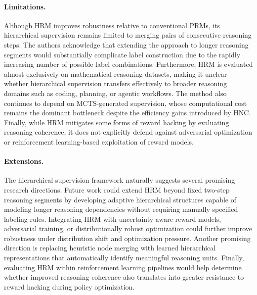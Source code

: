 \documentclass[11pt]{article}
\begin{document}
\paragraph{Limitations.}
Although HRM improves robustness relative to conventional PRMs, its hierarchical supervision remains limited to merging pairs of consecutive reasoning steps. The authors acknowledge that extending the approach to longer reasoning segments would substantially complicate label construction due to the rapidly increasing number of possible label combinations. Furthermore, HRM is evaluated almost exclusively on mathematical reasoning datasets, making it unclear whether hierarchical supervision transfers effectively to broader reasoning domains such as coding, planning, or agentic workflows. The method also continues to depend on MCTS-generated supervision, whose computational cost remains the dominant bottleneck despite the efficiency gains introduced by HNC. Finally, while HRM mitigates some forms of reward hacking by evaluating reasoning coherence, it does not explicitly defend against adversarial optimization or reinforcement learning-based exploitation of reward models.  

\paragraph{Extensions.}
The hierarchical supervision framework naturally suggests several promising research directions. Future work could extend HRM beyond fixed two-step reasoning segments by developing adaptive hierarchical structures capable of modeling longer reasoning dependencies without requiring manually specified labeling rules. Integrating HRM with uncertainty-aware reward models, adversarial training, or distributionally robust optimization could further improve robustness under distribution shift and optimization pressure. Another promising direction is replacing heuristic node merging with learned hierarchical representations that automatically identify meaningful reasoning units. Finally, evaluating HRM within reinforcement learning pipelines would help determine whether improved reasoning coherence also translates into greater resistance to reward hacking during policy optimization.
\end{document}
